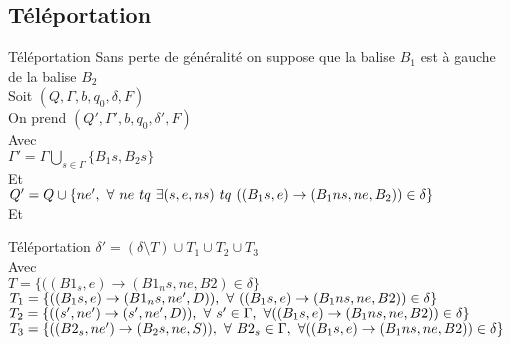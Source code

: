 \documentclass[12pt]{beamer}
\begin{document}
\subsection{Téléportation}
\begin{frame}{Téléportation}
    Sans perte de généralité on suppose que la balise $B_1$ est à gauche de la balise $B_2$\\
    Soit $(Q, \Gamma, b, q_0, \delta, F)$\\
    On prend $(Q', \Gamma', b, q_0, \delta', F)$\\
    Avec\\
    $\Gamma' = \Gamma \bigcup\limits_{s\in\Gamma} \{B_1s, B_2s\}$\\
    Et\\
    $Q' = Q \cup \{ne',\hspace{0.125cm}\forall \hspace{0.125cm} ne \hspace{0.125cm} tq \hspace{0.125cm} \exists (s,e,ns) \hspace{0.125cm} tq  \hspace{0.125cm} ((B_1s,e)\rightarrow(B_1ns,ne,B_2)) \in \delta\} $ \\
    Et\\
\end{frame}
\begin{frame}{Téléportation}
    $\delta' = (\delta\setminus T) \cup T_1 \cup T_2 \cup T_3$\\
    Avec\\
    $T = \{((B1_s,e)\rightarrow(B1_ns,ne,B2) \in \delta \}$ \\
    $T_1 = \{((B_1s,e)\rightarrow(B1_ns,ne',D)),\hspace{0.125cm}
    \forall \hspace{0.125cm} ((B_1s,e)\rightarrow(B_1ns,ne,B2)) \in \delta\}$\\
    $T_2 = \{((s',ne')\rightarrow(s',ne',D)),\hspace{0.125cm}\forall \hspace{0.125cm} s' \in \Gamma, \hspace{0.125cm} \forall((B_1s,e)\rightarrow(B_1ns,ne,B2)) \in \delta\}$\\
    $T_3 = \{((B2_s,ne')\rightarrow(B_2s,ne,S)),\hspace{0.125cm}\forall \hspace{0.125cm} B2_s \in \Gamma, \hspace{0.125cm} \forall((B_1s,e)\rightarrow(B_1ns,ne,B2)) \in \delta\}$\\
\end{frame}
\end{document}
